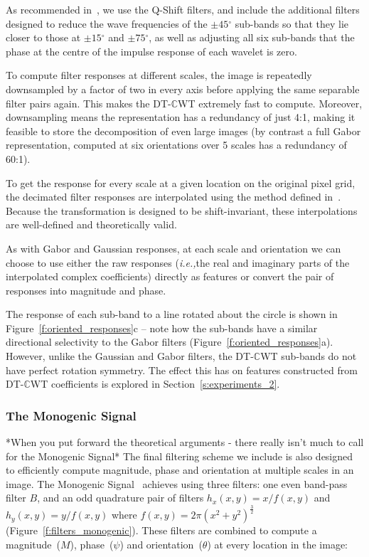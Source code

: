 \documentclass{IEEEtran}
\def\ie{\emph{i.e.,}}
\newcommand{\fref}[1]{Figure~\ref{#1}}
\newcommand{\sref}[1]{Section~\ref{#1}}
\def\dtcwt{DT-$\mathbb{C}$WT}
\def\deg{\ensuremath{^\circ}}
\begin{document}
As recommended in~\cite{Kingsbury_ECSP06}, we use the Q-Shift filters, and include the additional filters designed to reduce the wave frequencies of the $\pm 45\deg$ sub-bands so that they lie closer to those at $\pm 15\deg$ and $\pm 75\deg$, as well as adjusting all six sub-bands that the phase at the centre of the impulse response of each wavelet is zero.

To compute filter responses at different scales, the image is repeatedly downsampled by a factor of two in every axis before applying the same separable filter pairs again. This makes the \dtcwt{} extremely fast to compute. Moreover, downsampling means the representation has a redundancy of just 4:1, making it feasible to store the decomposition of even large images (by contrast a full Gabor representation, computed at six orientations over 5 scales has a redundancy of 60:1).

To get the response for every scale at a given location on the original pixel grid, the decimated filter responses are interpolated using the method defined in~\cite{Anderson_etal_ICIP05}. Because the transformation is designed to be shift-invariant, these interpolations are well-defined and theoretically valid.

As with Gabor and Gaussian responses, at each scale and orientation we can choose to use either the raw responses (\ie the real and imaginary parts of the interpolated complex coefficients) directly as features or convert the pair of responses into magnitude and phase.

The response of each sub-band to a line rotated about the circle is shown in \fref{f:oriented_responses}c -- note how the sub-bands have a similar directional selectivity to the Gabor filters (\fref{f:oriented_responses}a). However, unlike the Gaussian and Gabor filters, the \dtcwt{} sub-bands do not have perfect rotation symmetry. The effect this has on features constructed from \dtcwt{} coefficients is explored in \sref{s:experiments_2}.


\subsubsection{The Monogenic Signal}
\label{s:filtering_monogenic}

*When you put forward the theoretical arguments - there really isn't much to call for the Monogenic Signal*
The final filtering scheme we include is also designed to efficiently compute magnitude, phase and orientation at multiple scales in an image. The Monogenic Signal~\cite{Felsberg_Sommer_TSP01} achieves using three filters: one even band-pass filter $B$, and an odd quadrature pair of filters $h_x(x,y) = x/f(x,y)$ and $h_y(x,y) = y/f(x,y)$ where $f(x,y) = 2\pi(x^2 + y^2)^{\frac{3}{2}}$ (\fref{f:filters_monogenic}). These filters are combined to compute a magnitude~($M$), phase~($\psi$) and orientation~($\theta$) at every location in the image:
\end{document}
